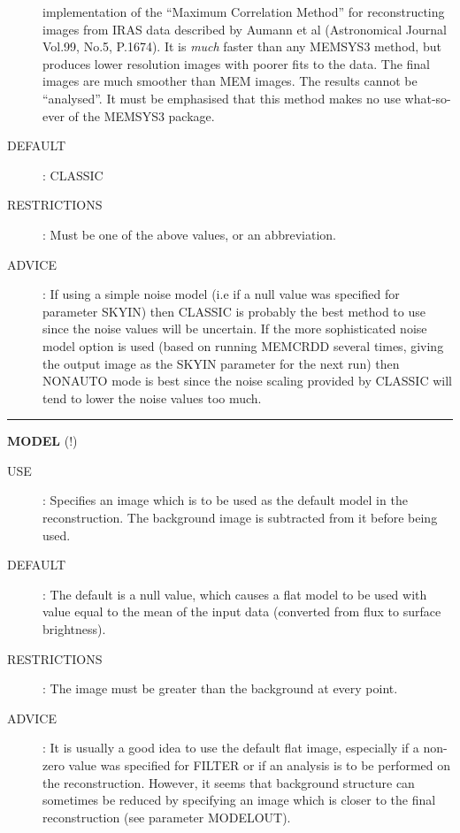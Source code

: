 \begin{description}
\begin {description}
implementation of the ``Maximum Correlation Method'' for reconstructing images 
from IRAS data 
described by Aumann et al (Astronomical Journal  Vol.99, No.5, P.1674). It is 
{\em much} faster than any MEMSYS3 method, but produces lower resolution images 
with poorer fits to the data. The final images are much smoother than MEM 
images. The results cannot be ``analysed''. It must be emphasised that this method 
makes no use what-so-ever of the MEMSYS3 package.
\end {description}
\item [DEFAULT]:
CLASSIC
\item [RESTRICTIONS]:
Must be one of the above values, or an abbreviation.
\item [ADVICE]:
If using a simple noise model (i.e if a null value was specified for parameter 
SKYIN) then CLASSIC is probably the best method to use since the noise values
will be uncertain. If the more sophisticated noise model option is used (based 
on running  MEMCRDD several times, giving the output image as the SKYIN parameter 
for the next run) then NONAUTO mode is best since the noise scaling provided by 
CLASSIC will tend to lower the noise values too much.
\end {description}

\rule{\textwidth}{0.3mm}
{\Large {\bf MODEL } (!)}
\begin{description}
\item [USE]:
Specifies an image which is to be used as the default model in the 
reconstruction. The background image is subtracted from it before being used.
\item [DEFAULT]:
The default is a null value, which causes a flat model to be used with value 
equal to the mean of the input data (converted from flux to surface brightness).
\item [RESTRICTIONS]:
The image must be greater than the background at every point.
\item [ADVICE]:
It is usually a good idea to use the default flat image, especially if a 
non-zero value was specified for FILTER or if an analysis is to be performed on 
the reconstruction. However, it seems that background structure can sometimes
be reduced by specifying an image which is closer to the final reconstruction 
(see parameter MODELOUT).
\end {description}

